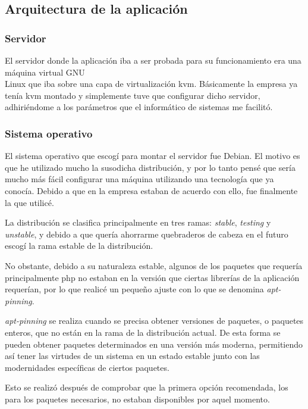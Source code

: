 \subsection{Arquitectura de la aplicación}
\subsubsection{Servidor}
El servidor donde la aplicación iba a ser probada para su funcionamiento era
una máquina virtual GNU\\Linux que iba sobre una capa de
virtualización \gls{kvm}. Básicamente la empresa ya tenía \gls{kvm} montado y
simplemente tuve que configurar dicho servidor, adhiriéndome a los parámetros
que el informático de sistemas me facilitó.

\subsubsection{Sistema operativo}
El sistema operativo que escogí para montar el servidor fue Debian. El motivo
es que he utilizado mucho la susodicha distribución, y por lo tanto pensé que
sería mucho más fácil configurar una máquina utilizando una tecnología que ya
conocía. Debido a que en la empresa estaban de acuerdo con ello, fue finalmente
la que utilicé.

La distribución se clasifica principalmente en tres ramas: \textit{stable},
\textit{testing} y \textit{unstable}, y debido a que quería ahorrarme
quebraderos de cabeza en el futuro escogí la rama estable de la distribución.

No obstante, debido a su naturaleza estable, algunos de los paquetes que
requería \textemdash principalmente \gls{php} \textemdash no estaban en la
versión que ciertas librerías de la aplicación requerían, por lo que realicé
un pequeño ajuste con lo que se denomina \textit{apt-pinning}.

\textit{apt-pinning} se realiza cuando se precisa obtener versiones de
paquetes, o paquetes enteros, que no están en la rama de la distribución
actual. De esta forma se pueden obtener paquetes determinados en una versión
más moderna, permitiendo así tener las virtudes de un sistema en un estado
estable junto con las modernidades específicas de ciertos paquetes.

Esto se realizó después de comprobar que la primera opción recomendada,
los  para los paquetes necesarios, no estaban
disponibles por aquel momento.

